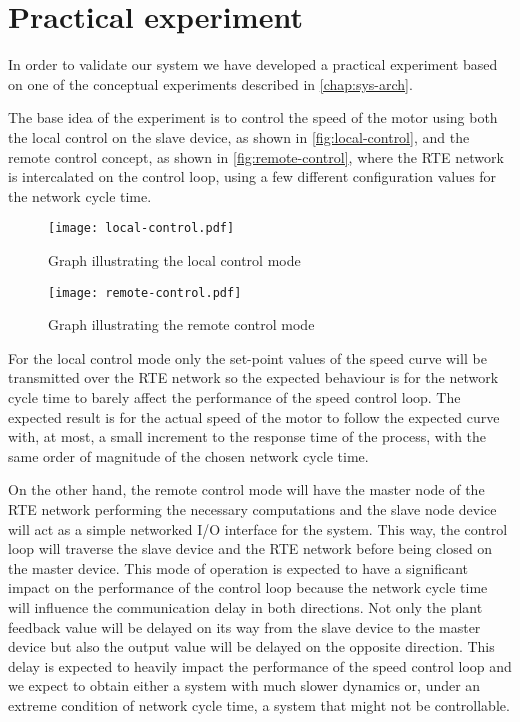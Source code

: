 \section{Practical experiment}
In order to validate our system we have developed a practical experiment based on one of the conceptual experiments described in \autoref{chap:sys-arch}.

The base idea of the experiment is to control the speed of the motor using both the local control on the slave device, as shown in \autoref{fig:local-control}, and the remote control concept, as shown in \autoref{fig:remote-control}, where the RTE network is intercalated on the control loop, using a few different configuration values for the network cycle time.

\begin{figure}[htp]
	\centering
	\texttt{[image: local-control.pdf]}
	\caption{Graph illustrating the local control mode}
	\label{fig:local-control}
\end{figure}

\begin{figure}[htp]
	\centering
	\texttt{[image: remote-control.pdf]}
	\caption{Graph illustrating the remote control mode}
	\label{fig:remote-control}
\end{figure}

For the local control mode only the set-point values of the speed curve will be transmitted over the RTE network so the expected behaviour is for the network cycle time to barely affect the performance of the speed control loop.
The expected result is for the actual speed of the motor to follow the expected curve with, at most, a small increment to the response time of the process, with the same order of magnitude of the chosen network cycle time.

On the other hand, the remote control mode will have the master node of the RTE network performing the necessary computations and the slave node device will act as a simple networked I/O interface for the system.
This way, the control loop will traverse the slave device and the RTE network before being closed on the master device.
This mode of operation is expected to have a significant impact on the performance of the control loop because the network cycle time will influence the communication delay in both directions.
Not only the plant feedback value will be delayed on its way from the slave device to the master device but also the output value will be delayed on the opposite direction.
This delay is expected to heavily impact the performance of the speed control loop and we expect to obtain either a system with much slower dynamics or, under an extreme condition of network cycle time, a system that might not be controllable.


